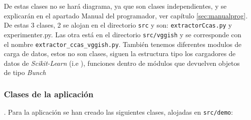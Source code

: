 De estas clases no se hará diagrama, ya que son clases independientes, y se explicarán en el apartado Manual del programador, ver capítulo \ref{sec:manualprog}. De estas 3 clases, 2 se alojan en el directorio \texttt{src} y son: \texttt{extractorCcas.py} y {experimenter.py}. Las otra está en el directorio \texttt{src/vggish} y se corresponde con el nombre \texttt{extractor\_ccas\_vggish.py}. También tenemos diferentes modulos de carga de datos, estos no son clases, siguen la estructura tipo los cargadores de datos de \textit{Scikit-Learn} (i.e ), funciones dentro de módulos que devuelven objetos de tipo \textit{Bunch}

\subsubsection{Clases de la aplicación}.
Para la aplicación se han creado las siguientes clases, alojadas en \texttt{src/demo}:
